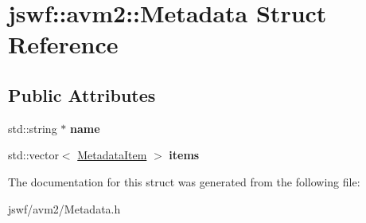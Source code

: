 \hypertarget{structjswf_1_1avm2_1_1_metadata}{\section{jswf\+:\+:avm2\+:\+:Metadata Struct Reference}
\label{structjswf_1_1avm2_1_1_metadata}
}
\subsection*{Public Attributes}
\begin{DoxyCompactItemize}
\item 
\hypertarget{structjswf_1_1avm2_1_1_metadata_ab20e450b84501dad71897274067ea3b3}{std\+::string $\ast$ {\bfseries name}}\label{structjswf_1_1avm2_1_1_metadata_ab20e450b84501dad71897274067ea3b3}

\item 
\hypertarget{structjswf_1_1avm2_1_1_metadata_a7de8e78cb0a42a1e83939d62b074df72}{std\+::vector$<$ \hyperlink{structjswf_1_1avm2_1_1_metadata_item}{Metadata\+Item} $>$ {\bfseries items}}\label{structjswf_1_1avm2_1_1_metadata_a7de8e78cb0a42a1e83939d62b074df72}

\end{DoxyCompactItemize}


The documentation for this struct was generated from the following file\+:\begin{DoxyCompactItemize}
\item 
jswf/avm2/Metadata.\+h\end{DoxyCompactItemize}
